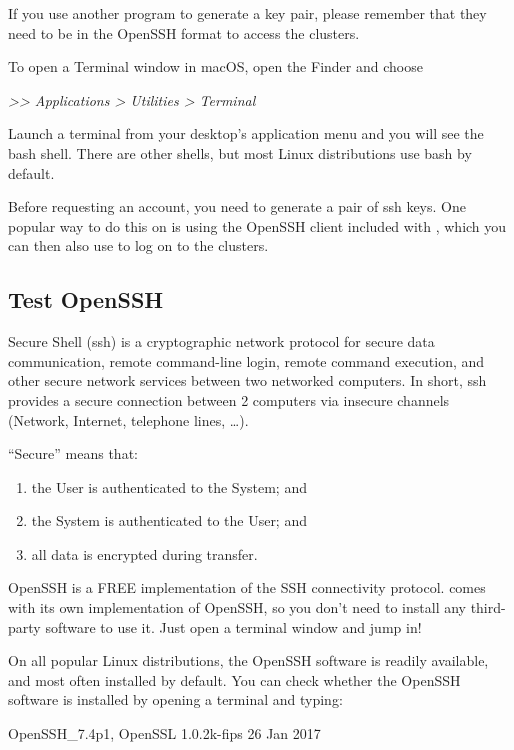   If you use another program to generate a key pair, please remember that they
  need to be in the OpenSSH format to access the \hpc clusters.
\fi %

\ifmac
  To open a Terminal window in macOS, open the Finder and choose

  \emph{>{}>{} Applications >{} Utilities >{} Terminal}
\fi

\iflinux
  Launch a terminal from your desktop's application menu and you will see the
  bash shell.
  There are other shells, but most Linux distributions use bash by default.
\fi

\ifmacORlinux
  Before requesting an account, you need to generate a pair of ssh keys. One
  popular way to do this on \OS is using the OpenSSH client included with \OS
  , which you can then also use to log on to the clusters.

  \subsection{Test OpenSSH}
  \label{sec:test-openssh}

  Secure Shell (ssh) is a cryptographic network protocol for secure data
  communication, remote command-line login, remote command execution, and other
  secure network services between two networked computers. In short, ssh
  provides a secure connection between 2 computers via insecure channels
  (Network, Internet, telephone lines, \ldots).

  ``Secure'' means that:
  \begin{enumerate}
    \item  the User is authenticated to the System; and
    \item  the System is authenticated to the User; and
    \item  all data is encrypted during transfer.
  \end{enumerate}

  OpenSSH is a FREE implementation of the SSH connectivity protocol. \OS comes
  with its own implementation of OpenSSH, so you don't need to install any
  third-party software to use it. Just open a terminal window and jump in!

  On all popular Linux distributions, the OpenSSH software is readily
  available, and most often installed by default. You can check whether the
  OpenSSH software is installed by opening a terminal and typing:

\begin{prompt}
OpenSSH_7.4p1, OpenSSL 1.0.2k-fips  26 Jan 2017
\end{prompt}

